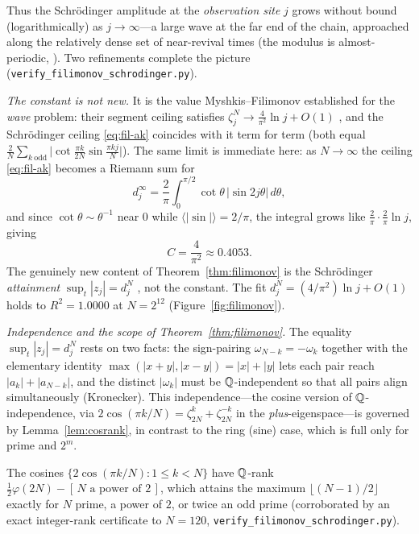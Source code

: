 \noindent Thus the Schr\"odinger amplitude at the \emph{observation site} $j$ grows without bound
(logarithmically) as $j\to\infty$---a large wave at the far end of the chain, approached along the
relatively dense set of near-revival times (the modulus is almost-periodic, \cite{Bohr}). Two refinements
complete the picture (\texttt{verify\_filimonov\_schrodinger.py}).

\emph{The constant is not new.} It is the value Myshkis--Filimonov established for the \emph{wave}
problem: their segment ceiling satisfies $\zeta_j^N\to\tfrac{4}{\pi^2}\ln j+O(1)$
\cite[Thm.~2]{MF03}, and the Schr\"odinger ceiling \eqref{eq:fil-ak} coincides with it term for term
(both equal $\tfrac2N\sum_{k\ \mathrm{odd}}\bigl|\cot\tfrac{\pi k}{2N}\sin\tfrac{\pi kj}{N}\bigr|$). The same
limit is immediate here: as $N\to\infty$ the ceiling \eqref{eq:fil-ak} becomes a Riemann sum for
\begin{equation}\label{eq:fil-int}
  d_j^\infty=\frac2\pi\int_0^{\pi/2}\cot\theta\,\bigl|\sin 2j\theta\bigr|\,d\theta,
\end{equation}
and since $\cot\theta\sim\theta^{-1}$ near $0$ while $\langle|\sin|\rangle=2/\pi$, the integral grows like
$\tfrac2\pi\cdot\tfrac2\pi\ln j$, giving
\begin{equation}\label{eq:fil-C}
  C=\frac{4}{\pi^2}\approx0.4053 .
\end{equation}
The genuinely new content of Theorem~\ref{thm:filimonov} is the Schr\"odinger \emph{attainment}
$\sup_t|z_j|=d_j^N$ \cite{F23}, not the constant. The fit $d_j^N=(4/\pi^2)\ln j+O(1)$ holds to
$R^2=1.0000$ at $N=2^{12}$ (Figure~\ref{fig:filimonov}).

\emph{Independence and the scope of Theorem~\ref{thm:filimonov}.} The equality $\sup_t|z_j|=d_j^N$ rests
on two facts: the sign-pairing $\omega_{N-k}=-\omega_k$ together with the elementary identity
$\max(|x+y|,|x-y|)=|x|+|y|$ lets each pair reach $|a_k|+|a_{N-k}|$, and the distinct $|\omega_k|$ must be
$\mathbb{Q}$-independent so that all pairs align simultaneously (Kronecker). This independence---the
cosine version of $\mathbb{Q}$-independence, via $2\cos(\pi k/N)=\zeta_{2N}^k+\zeta_{2N}^{-k}$ in the
\emph{plus}-eigenspace---is governed by Lemma~\ref{lem:cosrank}, in contrast to the ring (sine) case, which is
full only for prime and $2^m$.

\begin{lemma}\label{lem:cosrank}
The cosines $\{2\cos(\pi k/N):1\le k<N\}$ have $\mathbb{Q}$-rank $\tfrac12\varphi(2N)-[\,N\text{ a power of }2\,]$,
which attains the maximum $\lfloor(N-1)/2\rfloor$ exactly for $N$ prime, a power of $2$, or twice an odd prime
(corroborated by an exact integer-rank certificate to $N=120$, \texttt{verify\_filimonov\_schrodinger.py}).
\end{lemma}

